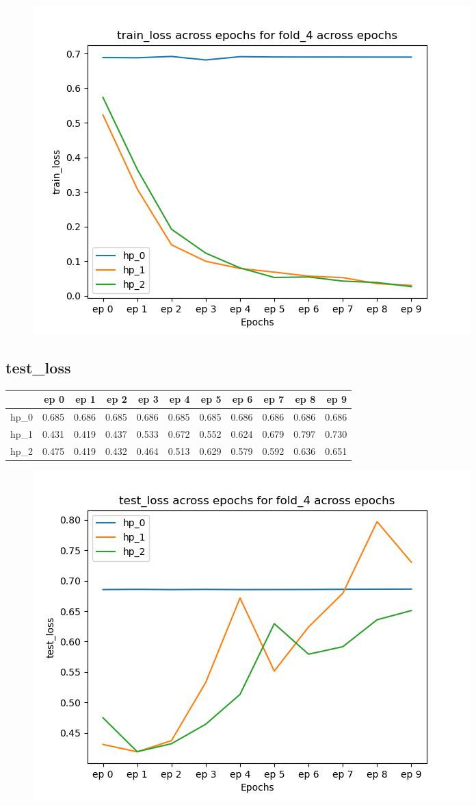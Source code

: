 \documentclass{article}
\begin{document}
\begin{figure}[H]
\includegraphics[scale = 0.75]{fold_4/train_loss}
\end{figure}
\subsection{test\_loss}
\begin{tabular}{lrrrrrrrrrr}
\toprule
{} &   ep 0 &   ep 1 &   ep 2 &   ep 3 &   ep 4 &   ep 5 &   ep 6 &   ep 7 &   ep 8 &   ep 9 \\
\midrule
hp\_0 &  0.685 &  0.686 &  0.685 &  0.686 &  0.685 &  0.685 &  0.686 &  0.686 &  0.686 &  0.686 \\
hp\_1 &  0.431 &  0.419 &  0.437 &  0.533 &  0.672 &  0.552 &  0.624 &  0.679 &  0.797 &  0.730 \\
hp\_2 &  0.475 &  0.419 &  0.432 &  0.464 &  0.513 &  0.629 &  0.579 &  0.592 &  0.636 &  0.651 \\
\bottomrule
\end{tabular}

\begin{figure}[H]
\includegraphics[scale = 0.75]{fold_4/test_loss}
\end{figure}
\end{document}

